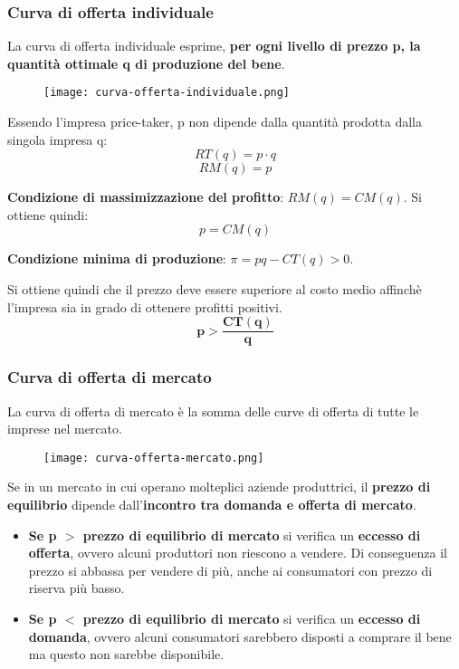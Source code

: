 \documentclass[../main.tex]{subfiles}
\begin{document}
\subsubsection{Curva di offerta individuale}
La curva di offerta individuale esprime, \textbf{per ogni livello di prezzo p, la quantità ottimale q di produzione del bene}.

\begin{figure}[h]
    \centering
    \texttt{[image: curva-offerta-individuale.png]}
\end{figure}

Essendo l'impresa price-taker, p non dipende dalla quantità prodotta dalla singola impresa q:
$$RT(q) = p\cdot q$$
$$RM(q) = p$$

\textbf{Condizione di massimizzazione del profitto}: $RM(q) = CM(q)$. Si ottiene quindi:
$$p = CM(q)$$

\textbf{Condizione minima di produzione}: $\pi = pq - CT(q) > 0$.

Si ottiene quindi che il prezzo deve essere superiore al costo medio affinchè l'impresa sia in grado di ottenere profitti positivi.
$$\mathbf{p > \frac{CT(q)}{q}}$$

\subsubsection{Curva di offerta di mercato}
La curva di offerta di mercato è la somma delle curve di offerta di tutte le imprese nel mercato.

\begin{figure}[h]
    \centering
    \texttt{[image: curva-offerta-mercato.png]}
\end{figure}

Se in un mercato in cui operano molteplici aziende produttrici, il \textbf{prezzo di equilibrio} dipende dall'\textbf{incontro tra domanda e offerta di mercato}.

\begin{itemize}
    \item \textbf{Se p $>$ prezzo di equilibrio di mercato} si verifica un \textbf{eccesso di offerta}, ovvero alcuni produttori non riescono a vendere. Di conseguenza il prezzo si abbassa per vendere di più, anche ai consumatori con prezzo di riserva più basso.
    \item \textbf{Se p $<$ prezzo di equilibrio di mercato} si verifica un \textbf{eccesso di domanda}, ovvero alcuni consumatori sarebbero disposti a comprare il bene ma questo non sarebbe disponibile.
\end{itemize}
\end{document}
